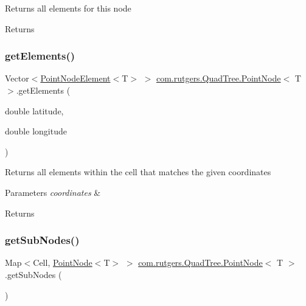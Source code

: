 Returns all elements for this node

\begin{DoxyReturn}{Returns}

\end{DoxyReturn}
\mbox{\label{classcom_1_1rutgers_1_1QuadTree_1_1PointNode_abf17594daa50fa4958b91a2991fcb1a1}} 
\subsubsection{\texorpdfstring{get\+Elements()}{getElements()}\hspace{0.1cm}{\footnotesize\ttfamily [2/2]}}
{\footnotesize\ttfamily Vector$<$\hyperlink{classcom_1_1rutgers_1_1QuadTree_1_1PointNodeElement}{Point\+Node\+Element}$<$T$>$ $>$ \hyperlink{classcom_1_1rutgers_1_1QuadTree_1_1PointNode}{com.\+rutgers.\+Quad\+Tree.\+Point\+Node}$<$ T $>$.get\+Elements (\begin{DoxyParamCaption}\item[{double}]{latitude,  }\item[{double}]{longitude }\end{DoxyParamCaption})}

Returns all elements within the cell that matches the given coordinates


\begin{DoxyParams}{Parameters}
{\em coordinates} & \\
\hline
\end{DoxyParams}
\begin{DoxyReturn}{Returns}

\end{DoxyReturn}
\mbox{\label{classcom_1_1rutgers_1_1QuadTree_1_1PointNode_a0e45f85c9b62f83648033a73c4d8247a}} 
\subsubsection{\texorpdfstring{get\+Sub\+Nodes()}{getSubNodes()}}
{\footnotesize\ttfamily Map$<$Cell, \hyperlink{classcom_1_1rutgers_1_1QuadTree_1_1PointNode}{Point\+Node}$<$T$>$ $>$ \hyperlink{classcom_1_1rutgers_1_1QuadTree_1_1PointNode}{com.\+rutgers.\+Quad\+Tree.\+Point\+Node}$<$ T $>$.get\+Sub\+Nodes (\begin{DoxyParamCaption}{ }\end{DoxyParamCaption})}

